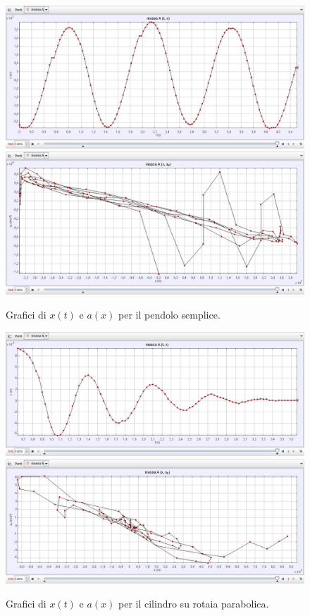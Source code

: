 \documentclass{article}
\begin{document}
\begin{figure}[H]
\centering
  \includegraphics[width=\textwidth]{pendolo_x_t}
  \includegraphics[width=\textwidth]{pendolo_a_x}
  \caption{Grafici di $x(t)$ e $a(x)$ per il pendolo semplice.}
  \label{fig:pendulum}
\end{figure}

\begin{figure}[H]
\centering
  \includegraphics[width=\textwidth]{cilindro_rotaia_x_t}
  \includegraphics[width=\textwidth]{cilindro_rotaia_a_x}
  \caption{Grafici di $x(t)$ e $a(x)$ per il cilindro su rotaia parabolica.}
  \label{fig:rotaia_parabolica}
\end{figure}
\end{document}
